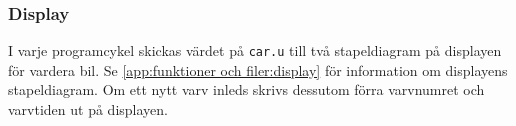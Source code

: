 \subsubsection{Display}

I varje programcykel skickas värdet på \texttt{car.u} till två stapeldiagram på
displayen för vardera bil. Se \ref{app:funktioner och filer:display} för information om displayens
stapeldiagram. Om ett nytt varv inleds skrivs dessutom förra varvnumret och
varvtiden ut på displayen.
